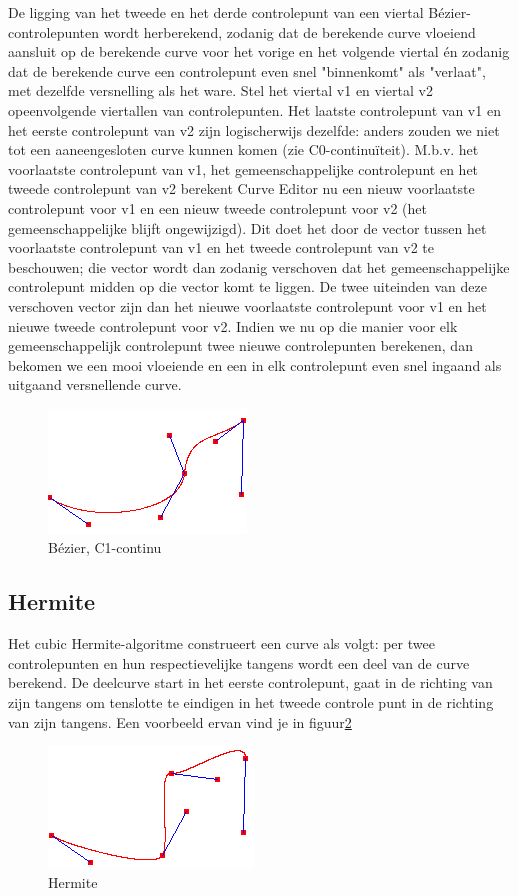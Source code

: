 \documentclass[a4paper,11pt,oneside, titlepage]{article}
\begin{document}
De ligging van het tweede en het derde controlepunt van een viertal B\'ezier-controlepunten wordt herberekend, zodanig dat de berekende curve vloeiend aansluit op de berekende curve voor het vorige en het volgende viertal \'en zodanig dat de berekende curve een controlepunt even snel "binnenkomt" als "verlaat", met dezelfde versnelling als het ware. Stel het viertal v1 en viertal v2 opeenvolgende viertallen van controlepunten. Het laatste controlepunt van v1 en het eerste controlepunt van v2 zijn logischerwijs dezelfde: anders zouden we niet tot een aaneengesloten curve kunnen komen (zie C0-continu\"iteit). M.b.v. het voorlaatste controlepunt van v1, het gemeenschappelijke controlepunt en het tweede controlepunt van v2 berekent Curve Editor nu een nieuw voorlaatste controlepunt voor v1 en een nieuw tweede controlepunt voor v2 (het gemeenschappelijke blijft ongewijzigd). Dit doet het door de vector tussen het voorlaatste controlepunt van v1 en het tweede controlepunt van v2 te beschouwen; die vector wordt dan zodanig verschoven dat het gemeenschappelijke controlepunt midden op die vector komt te liggen. De twee uiteinden van deze verschoven vector zijn dan het nieuwe voorlaatste controlepunt voor v1 en het nieuwe tweede controlepunt voor v2. Indien we nu op die manier voor elk gemeenschappelijk controlepunt twee nieuwe controlepunten berekenen, dan bekomen we een mooi vloeiende en een in elk controlepunt even snel ingaand als uitgaand versnellende curve.
\begin{figure}
\begin{center}
\includegraphics[scale=0.4]{./screenies2/bezierC1.png}
\caption{B\'ezier, C1-continu}\label{bezierC1}
\end{center}
\end{figure}
\subsection{Hermite}
Het cubic Hermite-algoritme construeert een curve als volgt: 
per twee controlepunten en hun respectievelijke tangens wordt een deel van de curve berekend.
De deelcurve start in het eerste controlepunt, gaat in de richting van zijn tangens om
tenslotte te eindigen in het tweede controle punt in de richting van zijn tangens. Een voorbeeld ervan vind je in figuur\ref{hermite}
\begin{figure}[htbp]
\centering
\includegraphics[scale=0.4]{./screenies2/hermite.png}
\caption{Hermite}\label{hermite}
\end{figure}
\end{document}
